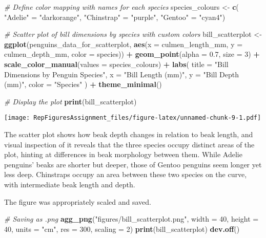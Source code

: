 \documentclass[
]{article}
\newenvironment{Shaded}{\begin{snugshade}}{\end{snugshade}}
\newcommand{\AttributeTok}[1]{\textcolor[rgb]{0.13,0.29,0.53}{#1}}
\newcommand{\CommentTok}[1]{\textcolor[rgb]{0.56,0.35,0.01}{\textit{#1}}}
\newcommand{\DecValTok}[1]{\textcolor[rgb]{0.00,0.00,0.81}{#1}}
\newcommand{\FloatTok}[1]{\textcolor[rgb]{0.00,0.00,0.81}{#1}}
\newcommand{\FunctionTok}[1]{\textcolor[rgb]{0.13,0.29,0.53}{\textbf{#1}}}
\newcommand{\NormalTok}[1]{#1}
\newcommand{\OtherTok}[1]{\textcolor[rgb]{0.56,0.35,0.01}{#1}}
\newcommand{\SpecialCharTok}[1]{\textcolor[rgb]{0.81,0.36,0.00}{\textbf{#1}}}
\newcommand{\StringTok}[1]{\textcolor[rgb]{0.31,0.60,0.02}{#1}}
\begin{document}
\begin{Shaded}
\begin{Highlighting}[]
\CommentTok{\# Define color mapping with names for each species}
\NormalTok{species\_colours }\OtherTok{\textless{}{-}} \FunctionTok{c}\NormalTok{(}
  \StringTok{"Adelie"} \OtherTok{=} \StringTok{"darkorange"}\NormalTok{, }
  \StringTok{"Chinstrap"} \OtherTok{=} \StringTok{"purple"}\NormalTok{, }
  \StringTok{"Gentoo"} \OtherTok{=} \StringTok{"cyan4"}\NormalTok{)}

\CommentTok{\# Scatter plot of bill dimensions by species with custom colors}
\NormalTok{bill\_scatterplot }\OtherTok{\textless{}{-}} \FunctionTok{ggplot}\NormalTok{(penguins\_data\_for\_scatterplot, }\FunctionTok{aes}\NormalTok{(}\AttributeTok{x =}\NormalTok{ culmen\_length\_mm, }\AttributeTok{y =}\NormalTok{ culmen\_depth\_mm, }\AttributeTok{color =}\NormalTok{ species)) }\SpecialCharTok{+}
  \FunctionTok{geom\_point}\NormalTok{(}\AttributeTok{alpha =} \FloatTok{0.7}\NormalTok{, }\AttributeTok{size =} \DecValTok{3}\NormalTok{) }\SpecialCharTok{+}
  \FunctionTok{scale\_color\_manual}\NormalTok{(}\AttributeTok{values =}\NormalTok{ species\_colours) }\SpecialCharTok{+}
  \FunctionTok{labs}\NormalTok{(}
    \AttributeTok{title =} \StringTok{"Bill Dimensions by Penguin Species"}\NormalTok{,}
    \AttributeTok{x =} \StringTok{"Bill Length (mm)"}\NormalTok{,}
    \AttributeTok{y =} \StringTok{"Bill Depth (mm)"}\NormalTok{,}
    \AttributeTok{color =} \StringTok{"Species"}
\NormalTok{  ) }\SpecialCharTok{+}
  \FunctionTok{theme\_minimal}\NormalTok{()}

\CommentTok{\# Display the plot}
\FunctionTok{print}\NormalTok{(bill\_scatterplot)}
\end{Highlighting}
\end{Shaded}

\texttt{[image: RepFiguresAssignment\_files/figure-latex/unnamed-chunk-9-1.pdf]}

The scatter plot shows how beak depth changes in relation to beak
length, and visual inspection of it reveals that the three species
occupy distinct areas of the plot, hinting at differences in beak
morphology between them. While Adelie penguins' beaks are shorter but
deeper, those of Gentoo penguins seem longer yet less deep. Chinstraps
occupy an area between these two species on the curve, with intermediate
beak length and depth.

The figure was appropriately scaled and saved.

\begin{Shaded}
\begin{Highlighting}[]
\CommentTok{\# Saving as .png}
\FunctionTok{agg\_png}\NormalTok{(}\StringTok{"figures/bill\_scatterplot.png"}\NormalTok{, }
        \AttributeTok{width =} \DecValTok{40}\NormalTok{, }\AttributeTok{height =} \DecValTok{40}\NormalTok{, }\AttributeTok{units =} \StringTok{"cm"}\NormalTok{, }\AttributeTok{res =} \DecValTok{300}\NormalTok{, }\AttributeTok{scaling =} \DecValTok{2}\NormalTok{)}
\FunctionTok{print}\NormalTok{(bill\_scatterplot)}
\FunctionTok{dev.off}\NormalTok{()}
\end{Highlighting}
\end{Shaded}
\end{document}
